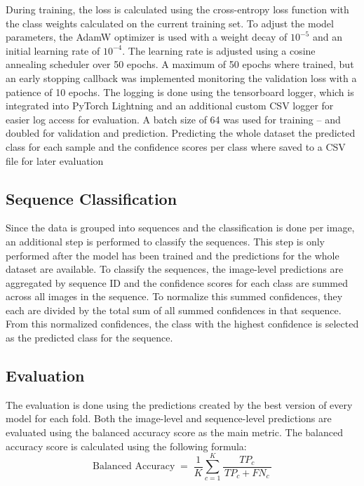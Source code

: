     During training, the loss is calculated using the cross-entropy loss function with the class weights calculated on the current training set.
    To adjust the model parameters, the AdamW optimizer \autocite{loshchilovDecoupledWeightDecay2019} is used with a weight decay of $10^{-5}$ and an initial learning rate of $10^{-4}$.
    The learning rate is adjusted using a cosine annealing scheduler \autocite{loshchilovSGDRStochasticGradient2017} over 50 epochs.
    A maximum of 50 epochs where trained, but an early stopping callback was implemented monitoring the validation loss with a patience of 10 epochs.
    The logging is done using the tensorboard logger, which is integrated into PyTorch Lightning and an additional custom CSV logger for easier log access for evaluation.
    A batch size of 64 was used for training -- and doubled for validation and prediction.
    Predicting the whole dataset the predicted class for each sample and the confidence scores per class where saved to a CSV file for later evaluation

    \subsection{Sequence Classification}
    Since the data is grouped into sequences and the classification is done per image, an additional step is performed to classify the sequences.
    This step is only performed after the model has been trained and the predictions for the whole dataset are available.
    To classify the sequences, the image-level predictions are aggregated by sequence ID and the confidence scores for each class are summed across all images in the sequence.
    To normalize this summed confidences, they each are divided by the total sum of all summed confidences in that sequence.
    From this normalized confidences, the class with the highest confidence is selected as the predicted class for the sequence.

    \subsection{Evaluation}

    The evaluation is done using the predictions created by the best version of every model for each fold.
    Both the image-level and sequence-level predictions are evaluated using the balanced accuracy score \autocite{brodersenBalancedAccuracyIts2010} as the main metric.
    The balanced accuracy score is calculated using the following formula:
    \begin{equation}
    \text{Balanced Accuracy}
    \;=\;
    \frac{1}{K} \sum_{c=1}^{K}
        \frac{TP_{c}}{\,TP_{c} + FN_{c}\,}
    \end{equation}

